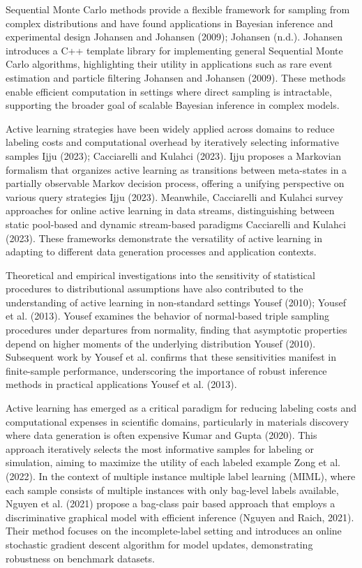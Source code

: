 Sequential Monte Carlo methods provide a flexible framework for sampling from complex distributions and have found applications in Bayesian inference and experimental design Johansen and Johansen (2009); Johansen (n.d.). Johansen introduces a C++ template library for implementing general Sequential Monte Carlo algorithms, highlighting their utility in applications such as rare event estimation and particle filtering Johansen and Johansen (2009). These methods enable efficient computation in settings where direct sampling is intractable, supporting the broader goal of scalable Bayesian inference in complex models.

Active learning strategies have been widely applied across domains to reduce labeling costs and computational overhead by iteratively selecting informative samples Ijju (2023); Cacciarelli and Kulahci (2023). Ijju proposes a Markovian formalism that organizes active learning as transitions between meta-states in a partially observable Markov decision process, offering a unifying perspective on various query strategies Ijju (2023). Meanwhile, Cacciarelli and Kulahci survey approaches for online active learning in data streams, distinguishing between static pool-based and dynamic stream-based paradigms Cacciarelli and Kulahci (2023). These frameworks demonstrate the versatility of active learning in adapting to different data generation processes and application contexts.

Theoretical and empirical investigations into the sensitivity of statistical procedures to distributional assumptions have also contributed to the understanding of active learning in non-standard settings Yousef (2010); Yousef et al. (2013). Yousef examines the behavior of normal-based triple sampling procedures under departures from normality, finding that asymptotic properties depend on higher moments of the underlying distribution Yousef (2010). Subsequent work by Yousef et al. confirms that these sensitivities manifest in finite-sample performance, underscoring the importance of robust inference methods in practical applications Yousef et al. (2013).

Active learning has emerged as a critical paradigm for reducing labeling costs and computational expenses in scientific domains, particularly in materials discovery where data generation is often expensive Kumar and Gupta (2020). This approach iteratively selects the most informative samples for labeling or simulation, aiming to maximize the utility of each labeled example Zong et al. (2022). In the context of multiple instance multiple label learning (MIML), where each sample consists of multiple instances with only bag-level labels available, Nguyen et al. (2021) propose a bag-class pair based approach that employs a discriminative graphical model with efficient inference (Nguyen and Raich, 2021). Their method focuses on the incomplete-label setting and introduces an online stochastic gradient descent algorithm for model updates, demonstrating robustness on benchmark datasets.

